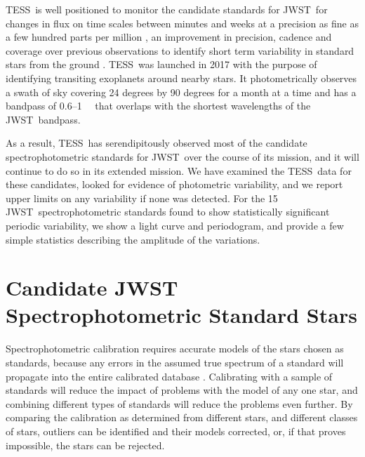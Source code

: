 \documentclass[twocolumn]{aastex631}
\newcommand{\webb}{JWST}
\newcommand{\jwst}{JWST}
\newcommand{\tess}{TESS}
\newcommand{\mum}{\ifmmode{\rm \mu m}\else{$\mu$m}\fi}
\begin{document}
\tess\ is well positioned to monitor the candidate standards for \webb\ for changes in flux on time scales between minutes and weeks at a precision as fine as a few hundred parts per million \citep{Ricker2015}, an improvement in precision, cadence and coverage over previous observations to identify short term variability in standard stars from the ground \citep[e.g.][]{Marinoni2016}.  \tess\ was launched in 2017 with the purpose of identifying transiting exoplanets around nearby stars.  It photometrically observes a swath of sky covering 24 degrees by 90 degrees for a month at a time and has a bandpass of 0.6--1~\mum\ \citep{Ricker2015} that overlaps with the shortest wavelengths of the \webb\ bandpass.

As a result, \tess\ has serendipitously observed most of the candidate spectrophotometric standards for \webb\ over the course of its mission, and it will continue to do so in its extended mission.  We have examined the \tess\ data for these candidates, looked for evidence of photometric variability, and we report upper limits on any variability if none was detected.  For the 15 \jwst\ spectrophotometric standards found to show statistically significant periodic variability, we show a light curve and periodogram, and provide a few simple statistics describing the amplitude of the variations. 


\section{Candidate JWST Spectrophotometric Standard Stars} 
\label{sec:targets}

Spectrophotometric calibration requires accurate models of the stars chosen as standards, because any errors in the assumed true spectrum of a standard will propagate into the entire calibrated database \citep{Gordon2022inprep}.  Calibrating with a sample of standards will reduce the impact of problems with the model of any one star, and combining different types of standards will reduce the problems even further.  By comparing the calibration as determined from different stars, and different classes of stars, outliers can be identified and their models corrected, or, if that proves impossible, the stars can be rejected.
\end{document}
